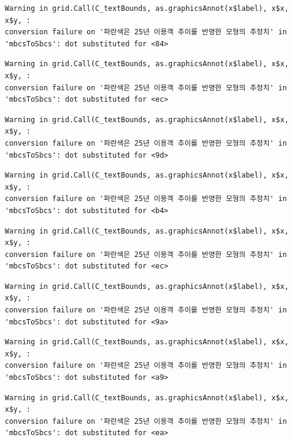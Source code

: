 \documentclass[
  letterpaper,
  DIV=11,
  numbers=noendperiod]{scrreprt}
\begin{document}
\begin{verbatim}
Warning in grid.Call(C_textBounds, as.graphicsAnnot(x$label), x$x, x$y, :
conversion failure on '파란색은 25년 이용객 추이를 반영한 모형의 추정치' in
'mbcsToSbcs': dot substituted for <84>
\end{verbatim}

\begin{verbatim}
Warning in grid.Call(C_textBounds, as.graphicsAnnot(x$label), x$x, x$y, :
conversion failure on '파란색은 25년 이용객 추이를 반영한 모형의 추정치' in
'mbcsToSbcs': dot substituted for <ec>
\end{verbatim}

\begin{verbatim}
Warning in grid.Call(C_textBounds, as.graphicsAnnot(x$label), x$x, x$y, :
conversion failure on '파란색은 25년 이용객 추이를 반영한 모형의 추정치' in
'mbcsToSbcs': dot substituted for <9d>
\end{verbatim}

\begin{verbatim}
Warning in grid.Call(C_textBounds, as.graphicsAnnot(x$label), x$x, x$y, :
conversion failure on '파란색은 25년 이용객 추이를 반영한 모형의 추정치' in
'mbcsToSbcs': dot substituted for <b4>
\end{verbatim}

\begin{verbatim}
Warning in grid.Call(C_textBounds, as.graphicsAnnot(x$label), x$x, x$y, :
conversion failure on '파란색은 25년 이용객 추이를 반영한 모형의 추정치' in
'mbcsToSbcs': dot substituted for <ec>
\end{verbatim}

\begin{verbatim}
Warning in grid.Call(C_textBounds, as.graphicsAnnot(x$label), x$x, x$y, :
conversion failure on '파란색은 25년 이용객 추이를 반영한 모형의 추정치' in
'mbcsToSbcs': dot substituted for <9a>
\end{verbatim}

\begin{verbatim}
Warning in grid.Call(C_textBounds, as.graphicsAnnot(x$label), x$x, x$y, :
conversion failure on '파란색은 25년 이용객 추이를 반영한 모형의 추정치' in
'mbcsToSbcs': dot substituted for <a9>
\end{verbatim}

\begin{verbatim}
Warning in grid.Call(C_textBounds, as.graphicsAnnot(x$label), x$x, x$y, :
conversion failure on '파란색은 25년 이용객 추이를 반영한 모형의 추정치' in
'mbcsToSbcs': dot substituted for <ea>
\end{verbatim}
\end{document}
